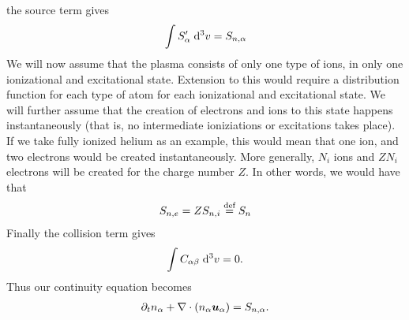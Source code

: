 %
the source term gives
%
\begin{align*}
    \int {S'_{\alpha}} \; \text{d} {^3v} = S_{n,\alpha}
\end{align*}
%
We will now assume that the plasma consists of only one type of ions, in only one ionizational and excitational state.
Extension to this would require a distribution function for each type of atom for each ionizational and excitational state.
We will further assume that the creation of electrons and ions to this state happens instantaneously (that is, no intermediate ioniziations or excitations takes place).
If we take fully ionized helium as an example, this would mean that one ion, and two electrons would be created instantaneously.
More generally, $N_i$ ions and $ZN_i$ electrons will be created for the charge number $Z$.
In other words, we would have that
%
\begin{align}
    S_{n,e}=ZS_{n,i}\overset{\text{def}}{=} S_n
    \label{eq:kinSource}
\end{align}
%
Finally the collision term gives
%
\begin{align*}
    \int {C_{\alpha\beta}} \; \text{d} {^3v} = 0.
\end{align*}
%
Thus our continuity equation becomes
%
\begin{align}
    \partial_t n_\alpha + \nabla\cdot\left(n_\alpha \boldsymbol{u}_\alpha\right) = S_{n,\alpha} \label{kin:cont}.
\end{align}

